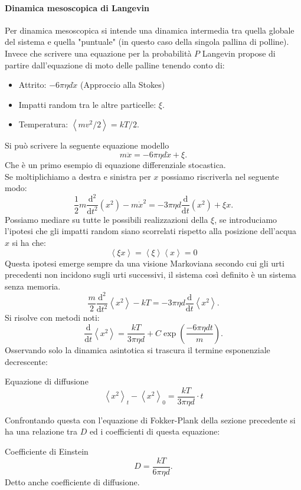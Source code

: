 \paragraph{Dinamica mesoscopica di Langevin}%
Per dinamica mesoscopica si intende una dinamica intermedia tra quella globale del sistema e quella "puntuale" (in questo caso della singola pallina di polline).\\
Invece che scrivere una equazione per la probabilità $P$ Langevin propose di partire dall'equazione di moto delle palline tenendo conto di:
\begin{itemize}
    \item Attrito: $-6\pi\eta d \dot{x}$ (Approccio alla Stokes) 
    \item Impatti random tra le altre particelle: $\xi$.
    \item Temperatura: $\left<mv^2/2\right> = kT/2$.
\end{itemize}
Si può scrivere la seguente equazione modello
\begin{equation}
    m\ddot{x} = -6\pi\eta d \dot{x} + \xi.
\end{equation}
Che è un primo esempio di equazione differenziale stocastica.\\
Se moltiplichiamo a destra e sinistra per $x$  possiamo riscriverla nel seguente modo:
\[
    \frac{1}{2}m\frac{\text{d} ^2}{\text{d} t^2}\left(x^2\right) - m\dot{x}^2 = -3\pi\eta d \frac{\text{d} }{\text{d} t}\left(x^2\right) + \xi x
.\] 
Possiamo mediare su tutte le possibili realizzazioni della $\xi$, se introduciamo l'ipotesi che gli impatti random siano scorrelati rispetto alla posizione dell'acqua $x$ si ha che:
\[
    \left<\xi x\right> = \left<\xi\right>\left<x\right> = 0 
\]
Questa ipotesi emerge sempre da una visione Markoviana secondo cui gli urti precedenti non incidono sugli urti successivi, il sistema così definito è un sistema senza memoria.
\[
    \frac{m}{2}\frac{\text{d} ^2}{\text{d} t^2} \left<x^2\right>-kT = -3\pi\eta d \frac{\text{d} }{\text{d} t} \left<x^2\right>
.\] 
Si risolve con metodi noti:
\[
    \frac{\text{d} }{\text{d} t} \left<x^2\right>=\frac{kT}{3\pi\eta d}+ C\exp\left(\frac{-6\pi\eta dt}{m}\right)
.\] 
Osservando solo la dinamica asintotica si trascura il termine esponenziale decrescente:
\begin{redbox}{Equazione di diffusione}
    \begin{equation}
       \left<x^2\right>_t-\left<x^2\right>_0 = \frac{kT}{3\pi\eta d}\cdot t
    \end{equation}
\end{redbox}
\noindent
Confrontando questa con l'equazione di Fokker-Plank della sezione precedente si ha una relazione tra $D$ ed i coefficienti di questa equazione:
\begin{bluebox}{Coefficiente di Einstein}
    \[
        D = \frac{kT}{6\pi\eta d}
    .\] 
    Detto anche coefficiente di diffusione.
\end{bluebox}

